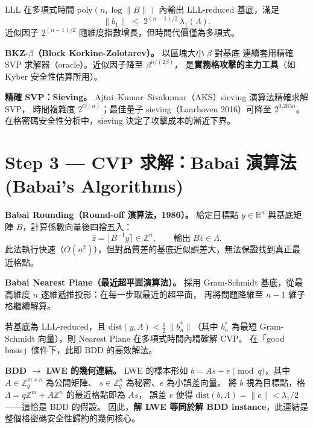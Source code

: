 \documentclass[12pt, a4paper]{article}
\begin{document}
\begin{tcolorbox}[
  colback=notebg, colframe=noteborder,
  title={\bfseries LLL 輸出保證},
  fonttitle=\small
]
LLL 在多項式時間 $\mathrm{poly}(n,\log\|B\|)$ 內輸出 LLL-reduced 基底，滿足
\[
  \|b_1\| \;\leq\; 2^{(n-1)/2}\,\lambda_1(\Lambda).
\]
近似因子 $2^{(n-1)/2}$ 隨維度指數增長，但時間代價僅為多項式。
\end{tcolorbox}

\textbf{BKZ-$\beta$（Block Korkine-Zolotarev）。} 以區塊大小 $\beta$ 對基底
連續套用精確 SVP 求解器（oracle）。近似因子降至 $\beta^{n/(2\beta)}$，
是\textbf{實務格攻擊的主力工具}（如 Kyber 安全性估算所用）。

\textbf{精確 SVP：Sieving。}
Ajtai--Kumar--Sivakumar（AKS）sieving 演算法精確求解 SVP，
時間複雜度 $2^{O(n)}$；最佳量子 sieving（Laarhoven 2016）可降至 $2^{0.265n}$。
在格密碼安全性分析中，sieving 決定了攻擊成本的漸近下界。

\section{Step 3 \;—\; CVP 求解：Babai 演算法 \small\normalfont\color{gray}(Babai's Algorithms)}

\textbf{Babai Rounding（Round-off 演算法，1986）。}
給定目標點 $y\in\mathbb{R}^n$ 與基底矩陣 $B$，計算係數向量後四捨五入：
\[
  \hat{z} = \bigl\lfloor B^{-1}y\bigr\rceil \in\mathbb{Z}^n,
  \qquad \text{輸出} \; B\hat{z}\in\Lambda.
\]
此法執行快速（$O(n^2)$），但對品質差的基底近似誤差大，無法保證找到真正最近格點。

\textbf{Babai Nearest Plane（最近超平面演算法）。}
採用 Gram-Schmidt 基底，從最高維度 $n$ 逐維遞推投影：在每一步取最近的超平面，
再將問題降維至 $n-1$ 維子格繼續解算。

\begin{tcolorbox}[
  colback=notebg, colframe=noteborder,
  title={\bfseries Nearest Plane 正確性條件},
  fonttitle=\small
]
若基底為 LLL-reduced，且 $\mathrm{dist}(y,\Lambda)<\tfrac{1}{2}\,\|b_n^*\|$（其中
$b_n^*$ 為最短 Gram-Schmidt 向量），則 Nearest Plane 在多項式時間內精確解 CVP。
在「good basis」條件下，此即 BDD 的高效解法。
\end{tcolorbox}

\textbf{BDD $\to$ LWE 的幾何連結。}
LWE 的樣本形如 $b = As + e \pmod{q}$，其中 $A\in\mathbb{Z}_q^{m\times n}$ 為公開矩陣、
$s\in\mathbb{Z}_q^n$ 為秘密、$e$ 為小誤差向量。
將 $b$ 視為目標點，格 $\Lambda=q\mathbb{Z}^m + A\mathbb{Z}^n$ 的最近格點即為 $As$，
誤差 $e$ 使得 $\mathrm{dist}(b,\Lambda)=\|e\|<\lambda_1/2$——這恰是 BDD 的假設。
因此，\textbf{解 LWE 等同於解 BDD instance}，此連結是整個格密碼安全性歸約的幾何核心。
\end{document}
